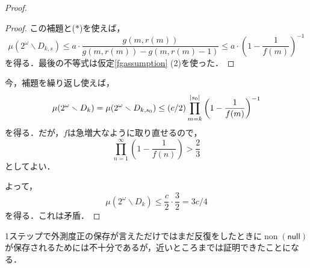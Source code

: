 \documentclass[uplatex]{jsarticle}
\newcommand{\non}{\operatorname{non}}
\newcommand{\nul}{\mathsf{null}}
\DeclarePairedDelimiter\abs{\lvert}{\rvert}
\renewcommand{\setminus}{\smallsetminus}
\theoremstyle{definition}
\begin{document}
\begin{proof}
\begin{proof}
		この補題と($\ast$)を使えば，
		\[
		\mu(2^\omega \setminus D_{k,s}) \le a \cdot \frac{g(m, r(m))}{g(m, r(m)) - g(m, r(m)-1)} \le a \cdot \left(1-\frac{1}{f(m)}\right)^{-1}
		\]
		を得る．最後の不等式は仮定\ref{fgassumption} (2)を使った．
	\end{proof}
	
	今，補題を繰り返し使えば，
	\[
	\mu(2^\omega \setminus D_k) = \mu(2^\omega \setminus D_{k,s_0}) \le (c/2) \prod_{m=k}^{\abs{s_0}} \left(1 - \frac{1}{f(m)}\right)^{-1}
	\]
	を得る．だが，$f$は急増大なように取り直せるので，
	\[
	\prod_{n=1}^\infty \left(1 - \frac1{f(n)}\right) > \frac23
	\]
	としてよい．
	
	よって，
	\[
	\mu(2^\omega \setminus D_k) \le \frac{c}2 \cdot \frac32 = 3c/4
	\]
	を得る．これは矛盾．
	\end{proof}

	1ステップで外測度正の保存が言えただけではまだ反復をしたときに$\non(\nul)$が保存されるためには不十分であるが，近いところまでは証明できたことになる．
	
	\nocite{*}
	\printbibliography[title={参考文献}]
	
\end{document}
